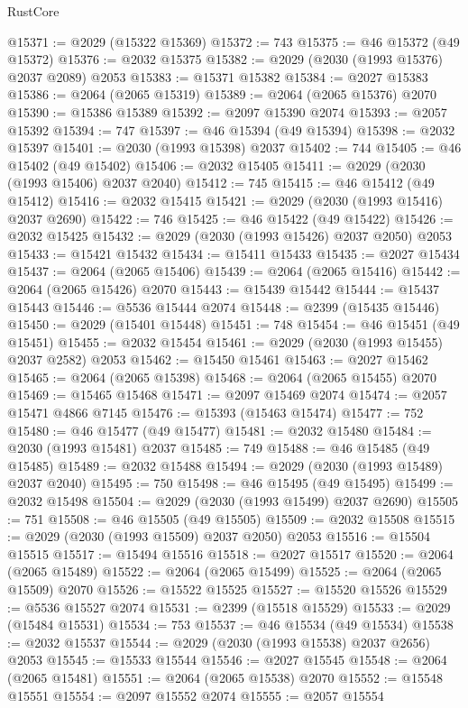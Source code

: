 \begin{lexlean}{RustCore}
\begin{coremodule}
@15371 := @2029 (@15322 @15369)
@15372 := 743
@15375 := @46 @15372 (@49 @15372)
@15376 := @2032 @15375
@15382 := @2029 (@2030 (@1993 @15376) @2037 @2089) @2053
@15383 := @15371 @15382
@15384 := @2027 @15383
@15386 := @2064 (@2065 @15319)
@15389 := @2064 (@2065 @15376) @2070
@15390 := @15386 @15389
@15392 := @2097 @15390 @2074
@15393 := @2057 @15392
@15394 := 747
@15397 := @46 @15394 (@49 @15394)
@15398 := @2032 @15397
@15401 := @2030 (@1993 @15398) @2037
@15402 := 744
@15405 := @46 @15402 (@49 @15402)
@15406 := @2032 @15405
@15411 := @2029 (@2030 (@1993 @15406) @2037 @2040)
@15412 := 745
@15415 := @46 @15412 (@49 @15412)
@15416 := @2032 @15415
@15421 := @2029 (@2030 (@1993 @15416) @2037 @2690)
@15422 := 746
@15425 := @46 @15422 (@49 @15422)
@15426 := @2032 @15425
@15432 := @2029 (@2030 (@1993 @15426) @2037 @2050) @2053
@15433 := @15421 @15432
@15434 := @15411 @15433
@15435 := @2027 @15434
@15437 := @2064 (@2065 @15406)
@15439 := @2064 (@2065 @15416)
@15442 := @2064 (@2065 @15426) @2070
@15443 := @15439 @15442
@15444 := @15437 @15443
@15446 := @5536 @15444 @2074
@15448 := @2399 (@15435 @15446)
@15450 := @2029 (@15401 @15448)
@15451 := 748
@15454 := @46 @15451 (@49 @15451)
@15455 := @2032 @15454
@15461 := @2029 (@2030 (@1993 @15455) @2037 @2582) @2053
@15462 := @15450 @15461
@15463 := @2027 @15462
@15465 := @2064 (@2065 @15398)
@15468 := @2064 (@2065 @15455) @2070
@15469 := @15465 @15468
@15471 := @2097 @15469 @2074
@15474 := @2057 @15471 @4866 @7145
@15476 := @15393 (@15463 @15474)
@15477 := 752
@15480 := @46 @15477 (@49 @15477)
@15481 := @2032 @15480
@15484 := @2030 (@1993 @15481) @2037
@15485 := 749
@15488 := @46 @15485 (@49 @15485)
@15489 := @2032 @15488
@15494 := @2029 (@2030 (@1993 @15489) @2037 @2040)
@15495 := 750
@15498 := @46 @15495 (@49 @15495)
@15499 := @2032 @15498
@15504 := @2029 (@2030 (@1993 @15499) @2037 @2690)
@15505 := 751
@15508 := @46 @15505 (@49 @15505)
@15509 := @2032 @15508
@15515 := @2029 (@2030 (@1993 @15509) @2037 @2050) @2053
@15516 := @15504 @15515
@15517 := @15494 @15516
@15518 := @2027 @15517
@15520 := @2064 (@2065 @15489)
@15522 := @2064 (@2065 @15499)
@15525 := @2064 (@2065 @15509) @2070
@15526 := @15522 @15525
@15527 := @15520 @15526
@15529 := @5536 @15527 @2074
@15531 := @2399 (@15518 @15529)
@15533 := @2029 (@15484 @15531)
@15534 := 753
@15537 := @46 @15534 (@49 @15534)
@15538 := @2032 @15537
@15544 := @2029 (@2030 (@1993 @15538) @2037 @2656) @2053
@15545 := @15533 @15544
@15546 := @2027 @15545
@15548 := @2064 (@2065 @15481)
@15551 := @2064 (@2065 @15538) @2070
@15552 := @15548 @15551
@15554 := @2097 @15552 @2074
@15555 := @2057 @15554

\end{coremodule}
\end{lexlean}
